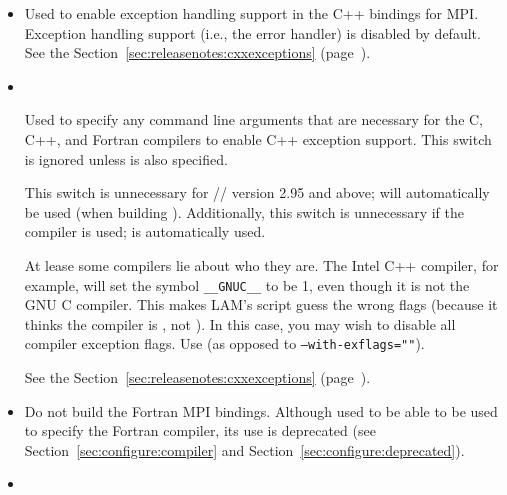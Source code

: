 \begin{itemize}


\item {}
  
  Used to enable exception handling support in the C++ bindings for
  MPI.  Exception handling support (i.e., the
   error handler) is
  disabled by default.  See the
  Section~\ref{sec:releasenotes:cxxexceptions}
  (page~\pageref{sec:releasenotes:cxxexceptions}).


\item {} \\

  Used to specify any command line arguments that are necessary for
  the C, C++, and Fortran compilers to enable C++ exception support.
  This switch is ignored unless  is also
  specified.
  
  This switch is unnecessary for // version
  2.95 and above;  will automatically be used
  (when building ).  Additionally, this
  switch is unnecessary if the  compiler is used; 
  is automatically used.

  
  At lease some compilers lie about who they are.  The Intel C++
  compiler, for example, will set the symbol {\tt \_\_GNUC\_\_} to be
  1, even though it is not the GNU C compiler.  This makes LAM's
   script guess the wrong flags (because it thinks the
  compiler is , not ).  In this case, you may wish
  to disable all compiler exception flags.  Use
   (as opposed to {\tt --with-exflags=""}).


  See the Section~\ref{sec:releasenotes:cxxexceptions}
  (page~\pageref{sec:releasenotes:cxxexceptions}).


\item {}
  
  Do not build the Fortran MPI bindings.  Although
   used to be able to be used to specify
  the Fortran compiler, its use is deprecated (see
  Section~\ref{sec:configure:compiler} and
  Section~\ref{sec:configure:deprecated}).


\item {}


\end{itemize}
